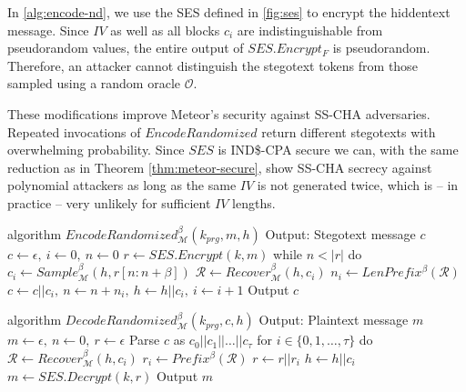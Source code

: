 
In \autoref{alg:encode-nd}, we use the SES defined in \autoref{fig:ses} to encrypt the hiddentext message.
Since $IV$ as well as all blocks $c_i$ are indistinguishable from pseudorandom values, the entire output of $SES.Encrypt_F$ is pseudorandom.
Therefore, an attacker cannot distinguish the stegotext tokens from those sampled using a random oracle $\mathcal{O}$.

These modifications improve Meteor's security against SS-CHA adversaries.
Repeated invocations of $EncodeRandomized$ return different stegotexts with overwhelming probability.
Since $SES$ is IND\$-CPA secure we can, with the same reduction as in Theorem \ref{thm:meteor-secure}, show SS-CHA secrecy against polynomial attackers as long as the same $IV$ is not generated twice, which is -- in practice -- very unlikely for sufficient $IV$ lengths.


\begin{Pseudocode}[float, caption={
Meteor $EncodeRandomized$ Algorithm.
This algorithm differs from the original $Encode$ algorithm by using SES to encrypt the message.
The ciphertext (which is indistinguishable from randomness and indeterministic) is then used to sample from $\mathcal{M}$.
}, label={alg:encode-nd}]
algorithm $EncodeRandomized_{\mathcal{M}}^{\beta}(k_{prg}, m, h)$
	Output: Stegotext message $c$
	$c \leftarrow \epsilon,~ i \leftarrow 0,~ n \leftarrow 0$
	$r \leftarrow SES.Encrypt(k, m)$
	while $n < |r|$ do
		$c_i \leftarrow Sample_{\mathcal{M}}^\beta(h, r[n: n+\beta])$
		$\mathcal{R} \leftarrow Recover_{\mathcal{M}}^\beta(h, c_i)$
		$n_i \leftarrow LenPrefix^\beta(\mathcal{R})$
		$c \leftarrow c || c_i,~ n \leftarrow n+n_i,~ h \leftarrow h||c_i,~ i \leftarrow i + 1$
	Output $c$
\end{Pseudocode}
\begin{Pseudocode}[float, caption={
Meteor $DecodeRandomized$ Algorithm.
This algorithm differs from the original Decode algorithm by using SES to decrypt the stegotext.
}, label={alg:decode-nd}]
algorithm $DecodeRandomized_{\mathcal{M}}^{\beta}(k_{prg}, c, h)$
	Output: Plaintext message $m$
	$m \leftarrow \epsilon,~ n \leftarrow 0,~ r \leftarrow \epsilon$
	Parse $c$ as $c_0 || c_1 || \dots || c_{\tau}$
	for $i \in \{ 0, 1, \dots, \tau \}$ do
		$\mathcal{R} \leftarrow Recover_{\mathcal{M}}^\beta(h, c_i)$
		$r_i \leftarrow Prefix^\beta(\mathcal{R})$
		$r \leftarrow r || r_i$
		$h \leftarrow h||c_i$
	$m \leftarrow SES.Decrypt(k, r)$
	Output $m$
\end{Pseudocode}